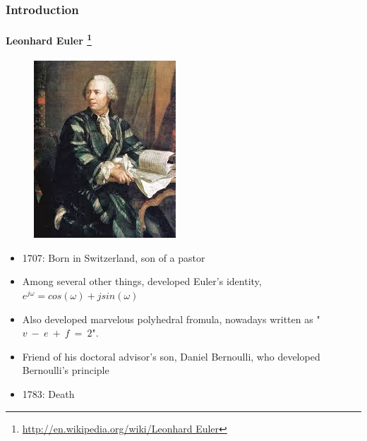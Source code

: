 \documentclass[hyperref={pdfpagelabels=true}]{beamer}
\begin{document}
\begin{frame}
\frametitle{Introduction}
\framesubtitle{Leonhard Euler \tiny{\footnote{\url{ http://en.wikipedia.org/wiki/Leonhard Euler}}}}
\begin{figure}[!tbp]
\centering
\includegraphics[scale = 0.35]{figs/download.jpg}
\end{figure}
\small{
\begin{itemize}
\item 1707: Born in Switzerland, son of a pastor
\item Among several other things, developed Euler's
identity, $e^{j\omega} = cos(\omega) + jsin(\omega)$
\item Also developed marvelous polyhedral fromula, nowadays written as "$v\ - \ e \ +\ f \ = \ 2$".
\item Friend of his doctoral advisor’s son, Daniel
Bernoulli, who developed Bernoulli’s principle
\item 1783: Death
\end{itemize}}
\end{frame}
\end{document}
